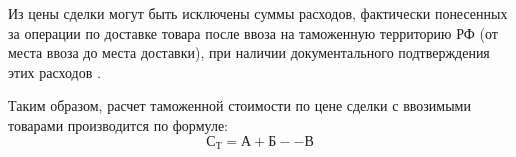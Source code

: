 Из цены сделки могут быть исключены суммы расходов, фактически понесенных за операции по доставке товара после ввоза на таможенную территорию РФ (от места ввоза до места доставки), при наличии документального подтверждения этих расходов \cites[с. 260--263]{mahovikova}[с. 528]{pokrovskaya}.

Таким образом, расчет таможенной стоимости по цене сделки с ввозимыми товарами производится по формуле:
\[\text{С}_\text{Т} = \text{А} + \text{Б} -- \text{В} \]













